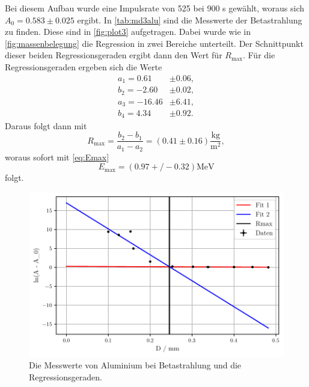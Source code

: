 Bei diesem Aufbau wurde eine Impulsrate von 525 bei 900 s gewählt, woraus sich $A_0 = 0.583 \pm 0.025$ ergibt.
In \autoref{tab:md3alu} sind die Messwerte der Betastrahlung zu finden.
Diese sind in \autoref{fig:plot3} aufgetragen.
Dabei wurde wie in \autoref{fig:massenbelegung} die Regression in zwei Bereiche unterteilt.
Der Schnittpunkt dieser beiden Regressionsgeraden ergibt dann den Wert für $R_\text{max}$.
Für die Regressionsgeraden ergeben sich die Werte 
\begin{align*}
    a_1= 0.61 &\pm 0.06,\\
    b_2= -2.60 &\pm 0.02,\\
    a_3= -16.46 &\pm 6.41,\\
    b_4= 4.34 &\pm 0.92.
\end{align*}
Daraus folgt dann mit
\begin{equation*}
    R_\text{max} = \frac{b_2 - b_1}{a_1 - a_2} = (0.41 \pm 0.16) \frac{\unit{\kilo\gram}}{\unit{\meter^2}} ,
\end{equation*}
woraus sofort mit \autoref{eq:Emax} 
\begin{equation*}
    E_\text{max} = (0.97+/-0.32) \unit{\mega\eV}
\end{equation*}
folgt.
\begin{figure}
    \centering
    \includegraphics[width=0.7 \linewidth]{build/plot3.pdf}
    \caption{Die Messwerte von Aluminium bei Betastrahlung und die Regressionsgeraden.}
    \label{fig:plot3}
\end{figure}


